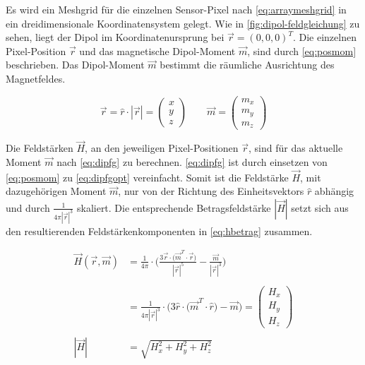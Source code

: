 \clearpage


Es wird ein Meshgrid für die einzelnen Sensor-Pixel nach \autoref{eq:arraymeshgrid} in ein dreidimensionale Koordinatensystem gelegt. Wie in \autoref{fig:dipol-feldgleichung} zu sehen, liegt der Dipol im Koordinatenursprung bei $\vec{r} = (0,0,0)^T$. Die einzelnen Pixel-Position $\vec{r}$ und das magnetische Dipol-Moment $\vec{m}$, sind durch \autoref{eq:posmom} beschrieben. Das Dipol-Moment $\vec{m}$ bestimmt die räumliche Ausrichtung des Magnetfeldes.


\begin{equation}\label{eq:posmom}
\vec{r} = \hat{r} \cdot |\vec{r}| = \begin{pmatrix} x \\ y \\ z \end{pmatrix} \qquad \vec{m} = \begin{pmatrix} m_x \\ m_y \\ m_z \end{pmatrix}
\end{equation}


Die Feldstärken $\vec{H}$, an den jeweiligen Pixel-Positionen $\vec{r}$, sind für das aktuelle Moment $\vec{m}$ nach \autoref{eq:dipfg} zu berechnen. \autoref{eq:dipfg} ist durch einsetzen von \autoref{eq:posmom} zu \autoref{eq:dipfgopt} vereinfacht. Somit ist die Feldstärke $\vec{H}$, mit dazugehörigen Moment $\vec{m}$, nur von der Richtung des Einheitsvektors $\hat{r}$ abhängig und durch 
$\frac{1}{4\pi|\vec{r}|^3}$ skaliert. Die entsprechende Betragsfeldstärke $|\vec{H}|$ setzt sich aus den resultierenden Feldstärkenkomponenten in \autoref{eq:hbetrag} zusammen.


\begin{align}
	\vec{H}(\vec{r},\vec{m}) &= \frac{1}{4\pi} \cdot \Bigg(\frac{3\vec{r} \cdot \big(\vec{m}^T \cdot \vec{r}\big)}{|\vec{r}|^5} - \frac{\vec{m}}{|\vec{r}|^3}\Bigg) \label{eq:dipfg} \\
							 \nonumber \\
							 &= \frac{1}{4\pi|\vec{r}|^3} \cdot \Big(3\hat{r} \cdot \big(\vec{m}^T \cdot \hat{r}\big) - \vec{m}\Big) = \begin{pmatrix} H_x \\ H_y \\ H_z \end{pmatrix} \label{eq:dipfgopt} \\
						     \nonumber \\
				   |\vec{H}| &= \sqrt{ H_x^2 + H_y^2 + H_z^2 } \label{eq:hbetrag}
\end{align}


